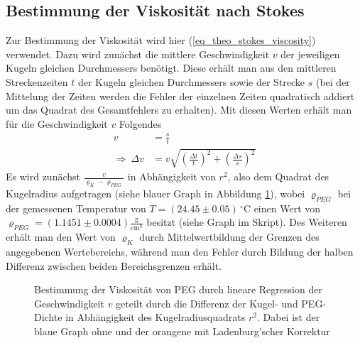 \documentclass[12pt,a4paper,german]{scrartcl}
\numberwithin{equation}{section}
\begin{document}
  \subsection{Bestimmung der Viskosität nach Stokes}
  Zur Bestimmung der Viskosität wird hier (\ref{eq_theo_stokes_viscosity}) verwendet.
  Dazu wird zunächst die mittlere Geschwindigkeit $v$ der jeweiligen Kugeln gleichen Durchmessers benötigt.
  Diese erhält man aus den mittleren Streckenzeiten $t$ der Kugeln gleichen Durchmessers sowie der Strecke $s$ (bei der Mittelung der Zeiten werden die Fehler der einzelnen Zeiten quadratisch addiert um das Quadrat des Gesamtfehlers zu erhalten).
  Mit diesen Werten erhält man für die Geschwindigkeit $v$ Folgendes
  \begin{align}
    v &= \frac{s}{t} \nonumber \\
    \Rightarrow \ \Delta v &= v \sqrt{\left(\frac{\Delta t}{t}\right)^2 + \left(\frac{\Delta s}{s}\right)^2}
  \end{align}
  Es wird zunächst $\frac{v}{\varrho_K - \varrho_{PEG}}$ in Abhängigkeit von $r^2$, also dem Quadrat des Kugelradius aufgetragen (siehe blauer Graph in Abbildung \ref{fig_stokes_viscosity_regression}), wobei $\varrho_{PEG}$ bei der gemessenen Temperatur von $T = (24.45 \pm 0.05) \, ^\circ$C einen Wert von $\varrho_{PEG} = (1.1451 \pm 0.0004) \frac{\text{g}}{\text{cm}^3}$ besitzt (siehe Graph im Skript).
  Des Weiteren erhält man den Wert von $\varrho_K$ durch Mittelwertbildung der Grenzen des angegebenen Wertebereichs, während man den Fehler durch Bildung der halben Differenz zwischen beiden Bereichsgrenzen erhält.

  \begin{figure}[h]
    \centering
    \resizebox{0.9\textwidth}{!}{
      
    }
    \caption{Bestimmung der Viskosität von PEG durch lineare Regression der Geschwindigkeit $v$ geteilt durch die Differenz der Kugel- und PEG-Dichte in Abhängigkeit des Kugelradiusquadrats $r^2$. Dabei ist der blaue Graph ohne und der orangene mit Ladenburg'scher Korrektur}
    \label{fig_stokes_viscosity_regression}
  \end{figure}
\end{document}
